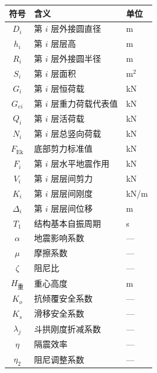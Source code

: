 \documentclass[12pt,a4paper,UTF8]{ctexart}
\begin{document}
\begin{center}
    \begin{tabular}{cll}
        \toprule
        符号              & 含义             & 单位    \\
        \midrule
        $D_i$           & 第 $i$ 层外接圆直径   & m     \\
        $h_i$           & 第 $i$ 层层高      & m     \\
        $R_i$           & 第 $i$ 层外接圆半径   & m     \\
        $S_i$           & 第 $i$ 层面积      & m$^2$ \\
        $G_i$           & 第 $i$ 层恒荷载     & kN    \\
        $G_{ei}$        & 第 $i$ 层重力荷载代表值 & kN    \\
        $Q_i$           & 第 $i$ 层活荷载     & kN    \\
        $N_i$           & 第 $i$ 层总竖向荷载   & kN    \\
        $F_{\text{Ek}}$ & 底部剪力标准值        & kN    \\
        $F_i$           & 第 $i$ 层水平地震作用  & kN    \\
        $V_i$           & 第 $i$ 层层间剪力    & kN    \\
        $K_i$           & 第 $i$ 层层间刚度    & kN/m  \\
        $\Delta_i$      & 第 $i$ 层层间位移    & m     \\
        $T_1$           & 结构基本自振周期       & s     \\
        $\alpha$        & 地震影响系数         & —     \\
        $\mu$           & 摩擦系数           & —     \\
        $\zeta$         & 阻尼比            & —     \\
        $H_{\text{重}}$  & 重心高度           & m     \\
        $K_o$           & 抗倾覆安全系数        & —     \\
        $K_s$           & 滑移安全系数         & —     \\
        $\lambda_j$     & 斗拱刚度折减系数       & —     \\
        $\eta$          & 隔震效率           & —     \\
        $\eta_2$        & 阻尼调整系数         & —     \\
        \bottomrule
    \end{tabular}
\end{center}
\end{document}
